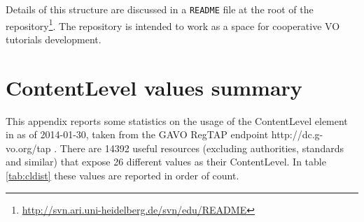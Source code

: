 \documentclass{ivoa}
\begin{document}
Details of this structure are discussed in a \texttt{README} file at the
root of the
repository\footnote{\url{http://svn.ari.uni-heidelberg.de/svn/edu/README}}.
The repository is intended to work as a space for cooperative 
VO tutorials development.




\appendix

\section{ContentLevel values summary}

\label{app:clcurrval}


This appendix reports some statistics on the usage of the ContentLevel 
element in \citep{2008ivoa.spec.0222P} as of 2014-01-30, taken from the
GAVO RegTAP endpoint http://dc.g-vo.org/tap .
There are 14392 useful resources (excluding authorities, standards and
similar) that expose 26 different values as their ContentLevel.
In table \ref{tab:cldist} these values are reported in order of count.
\end{document}
